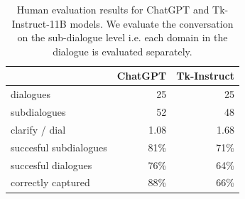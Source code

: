 \begin{table}[tp]
    \centering\small
    \begin{tabular}{l|r|r}
    \toprule
    & \textbf{ChatGPT} & \textbf{Tk-Instruct} \\
    \midrule
    dialogues & 25 & 25 \\
    subdialogues & 52 & 48 \\
    clarify / dial & 1.08 & 1.68 \\
    succesful subdialogues & 81\% & 71\% \\
    succesful dialogues & 76\% & 64\% \\
    correctly captured & 88\% & 66\% \\
    \bottomrule
    
    
    \end{tabular}
    \caption{Human evaluation results for ChatGPT and Tk-Instruct-11B models. We evaluate the conversation on the sub-dialogue level i.e. each domain in the dialogue is evaluated separately. }
    \label{tab:human}
\end{table}


